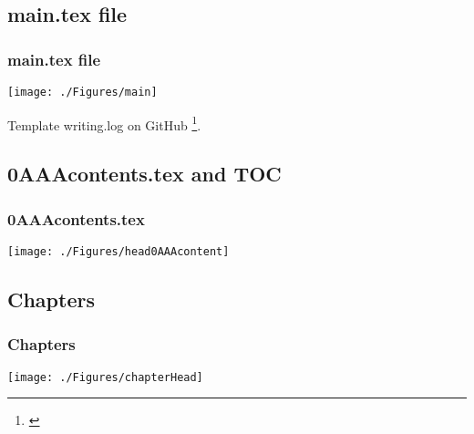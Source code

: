 \documentclass{beamer}
\begin{document}
\subsection{main.tex file}
\begin{frame}
\frametitle{main.tex file}
\begin{center}
\begin{center}
    \texttt{[image: ./Figures/main]}
\end{center}
Template writing.log on GitHub \footnote{\url{}}.
\end{center}
\end{frame}
\note{}


\subsection{0AAAcontents.tex and TOC}
\begin{frame}
\frametitle{0AAAcontents.tex}
\begin{center}
\begin{center}
    \texttt{[image: ./Figures/head0AAAcontent]}
\end{center}
\end{center}
\end{frame}
\note{}


\subsection{Chapters}
\begin{frame}
\frametitle{Chapters}
\begin{center}
\begin{center}
    \texttt{[image: ./Figures/chapterHead]}
\end{center}
\end{center}
\end{frame}
\note{}


\end{document}
